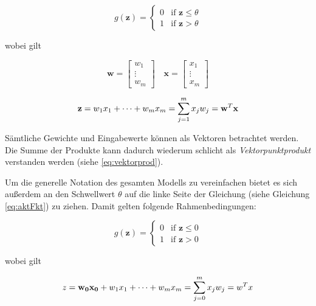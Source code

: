 \begin{equation} \label{eq:aktFkt}
g(\mathbf{z}) =\begin{cases}
	0 & \mbox{if } \mathbf{z} \leq \theta \\
    1 & \mbox{if } \mathbf{z} > \theta
  \end{cases}
\end{equation}

wobei gilt

\begin{equation} \label{eq:vektorprod}
\mathbf{w} = \begin{bmatrix}
    w_{1}  \\
    \vdots \\
    w_{m}
\end{bmatrix}
\quad  \mathbf{x} = \begin{bmatrix}
    x_{1}  \\
    \vdots \\
    x_{m}
\end{bmatrix}
\end{equation}

\begin{equation}
\mathbf{z} =  w_1x_{1} + \dots + w_mx_{m} = \sum_{j=1}^{m} x_{j}w_{j} \\ = \mathbf{w}^T\mathbf{x}
\end{equation}

Sämtliche Gewichte und Eingabewerte können als Vektoren betrachtet werden. Die Summe der Produkte kann dadurch wiederum schlicht als \emph{Vektorpunktprodukt} verstanden werden (siehe \autoref{eq:vektorprod}).

Um die generelle Notation des gesamten Modells zu vereinfachen bietet es sich außerdem an den Schwellwert $\theta$ auf die linke Seite der Gleichung (siehe Gleichung \ref{eq:aktFkt}) zu ziehen. Damit gelten folgende Rahmenbedingungen:

\begin{equation} \label{eq:aktFkt2}
g(\mathbf{z}) =\begin{cases}
	0 & \mbox{if } \mathbf{z} \leq 0 \\
    1 & \mbox{if } \mathbf{z} > 0
  \end{cases}
\end{equation}

wobei gilt

\begin{equation} \label{eq:vektorprod}
z =  \mathbf{w_0x_{0}} + w_1x_{1} + \dots + w_mx_{m} = \sum_{j=0}^{m} x_{j}w_{j} \\ = w^Tx
\end{equation}


